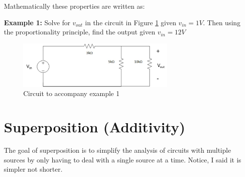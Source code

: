 \documentclass{handout}
\begin{document}
Mathematically these properties are written as:

\newpage
\clearpage
\pagebreak

\textbf{Example 1:} Solve for $v_{out}$ in the circuit in Figure \ref{fig: Example1} given $v_{in} = 1V$.  Then using the proportionality principle, find the output given  $v_{in}=12V$
\begin{figure} [h t b]
\centering
\includegraphics[width=0.7\textwidth]{Example1.jpg}
\caption{Circuit to accompany example 1}
\label{fig: Example1}
\end{figure}


\newpage
\clearpage
\pagebreak

\section{Superposition (Additivity)}
The goal of superposition is to simplify the analysis of circuits with multiple sources by only having to deal with a single source at a time.  Notice, I said it is simpler not shorter.
\end{document}
